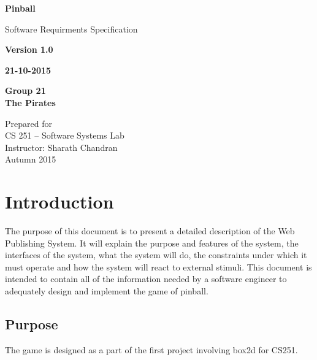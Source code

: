 \documentclass{article}
\begin{document}
    \begin{titlepage}
    \begin{center}
        \vspace*{1cm}
        
        \Huge
        \textbf{Pinball}
        
        \vspace{1.5cm}
        \LARGE
        Software Requirments Specification
        
        \vspace{0.5cm}
        \textbf{Version 1.0}

        \vspace{0.5cm}
        \textbf{21-10-2015}

        \vspace{1.5cm}
        \textbf{Group 21}\\
        \textbf{The Pirates}
        
        \vfill
        
        \vspace{0.8cm}        
        \Large
        Prepared for\\
        CS 251 – Software Systems Lab\\
        Instructor: Sharath Chandran\\
        Autumn 2015
        
    \end{center}
\end{titlepage}
    \tableofcontents
    \thispagestyle{empty}
    \cleardoublepage
    \newpage

    \section{Introduction}
    The purpose of this document is to present a detailed description of the Web Publishing System. It will explain the purpose and features of the system, the interfaces of the system, what the system will do, the constraints under which it must operate and how the system will react to external stimuli.  This document is intended to contain all of the information needed by a software engineer to adequately design and implement the game of pinball.

    \subsection{Purpose}
    The game is designed as a part of the first project involving box2d for CS251.
\end{document}
